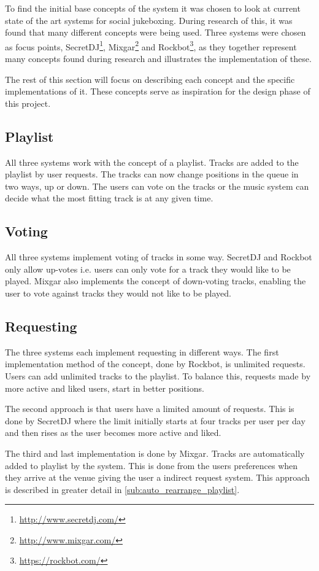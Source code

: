 To find the initial base concepts of the system it was chosen to look at current state of the art systems for social jukeboxing. During research of this, it was found that many different concepts were being used. Three systems were chosen as focus points, SecretDJ\footnote{\url{http://www.secretdj.com/}}, Mixgar\footnote{\url{http://www.mixgar.com/}} and Rockbot\footnote{\url{https://rockbot.com/}}, as they together represent many concepts found during research and illustrates the implementation of these.

The rest of this section will focus on describing each concept and the specific implementations of it. These concepts serve as inspiration for the design phase of this project.

\subsection{Playlist}
All three systems work with the concept of a playlist. Tracks are added to the playlist by user requests. The tracks can now change positions in the queue in two ways, up or down. The users can vote on the tracks or the music system can decide what the most fitting track is at any given time.

\subsection{Voting}
All three systems implement voting of tracks in some way. SecretDJ and Rockbot only allow up-votes i.e. users can only vote for a track they would like to be played. Mixgar also implements the concept of down-voting tracks, enabling the user to vote against tracks they would not like to be played.

\subsection{Requesting}
The three systems each implement requesting in different ways. The first implementation method of the concept, done by Rockbot, is unlimited requests. Users can add unlimited tracks to the playlist. To balance this, requests made by more active and liked
users, start in better positions.

The second approach is that users have a limited amount of requests. This is done by SecretDJ where the limit initially starts at four tracks per user per day and then rises as the user becomes more active and liked.

The third and last implementation is done by Mixgar. Tracks are  automatically added to playlist by the system. This is done from the users preferences when they arrive at the venue giving the user a indirect request system. This approach is described in greater detail in \cref{sub:auto_rearrange_playlist}.


